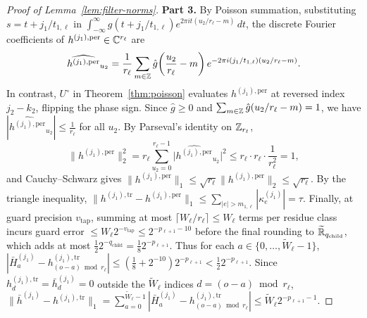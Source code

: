 \begin{proof}[Proof of Lemma~\ref{lem:filter-norms}]
\textbf{Part 3.} By Poisson summation, substituting $s = t + j_1/t_{1,\ell}$ in $\int_{-\infty}^\infty g(t + j_1/t_{1,\ell}) e^{2\pi i t(u_2/r_\ell - m)}\,dt$, the discrete Fourier coefficients of $h^{(j_1),\mathrm{per}} \in \mathbb{C}^{r_\ell}$ are
\[
  \widehat{h^{(j_1),\mathrm{per}}}_{u_2} = \frac{1}{r_\ell} \sum_{m \in \mathbb{Z}} \hat{g}\!\left(\frac{u_2}{r_\ell} - m\right) e^{-2\pi i (j_1/t_{1,\ell})(u_2/r_\ell - m)}.
\]
In contrast, $U^\circ$ in Theorem~\ref{thm:poisson} evaluates $h^{(j_1),\mathrm{per}}$ at reversed index $j_2 - k_2$, flipping the phase sign. Since $\hat{g} \ge 0$ and $\sum_{m \in \mathbb{Z}} \hat{g}(u_2/r_\ell - m) = 1$, we have $|\widehat{h^{(j_1),\mathrm{per}}}_{u_2}| \le \frac{1}{r_\ell}$ for all $u_2$. By Parseval's identity on $\mathbb{Z}_{r_\ell}$,
\[
  \|h^{(j_1),\mathrm{per}}\|_2^2 = r_\ell \sum_{u_2=0}^{r_\ell-1} \bigl|\widehat{h^{(j_1),\mathrm{per}}}_{u_2}\bigr|^2 \le r_\ell \cdot r_\ell \cdot \frac{1}{r_\ell^2} = 1,
\]
and Cauchy--Schwarz gives $\|h^{(j_1),\mathrm{per}}\|_1 \le \sqrt{r_\ell}\|h^{(j_1),\mathrm{per}}\|_2 \le \sqrt{r_\ell}$. By the triangle inequality, $\|h^{(j_1),\mathrm{tr}} - h^{(j_1),\mathrm{per}}\|_1 \le \sum_{|e| > m_{1,\ell}} |\kappa^{(j_1)}_e| = \tau$. Finally, at guard precision $v_{\mathrm{tap}}$, summing at most $\lceil W_\ell/r_\ell \rceil \le W_\ell$ terms per residue class incurs guard error $\le W_\ell 2^{-v_{\mathrm{tap}}} \le 2^{-p_{\ell+1}-10}$ before the final rounding to $\widetilde{\mathbb{R}}_{q_{\mathrm{child}}}$, which adds at most $\frac{1}{2} 2^{-q_{\mathrm{child}}} = \frac{1}{8} 2^{-p_{\ell+1}}$. Thus for each $a \in \{0, \dots, \tilde{W}_\ell-1\}$, $|\bar{H}^{(j_1)}_a - h^{(j_1),\mathrm{tr}}_{(o-a)\bmod r_\ell}| \le (\frac{1}{8} + 2^{-10})2^{-p_{\ell+1}} < \frac{1}{2} 2^{-p_{\ell+1}}$. Since $h^{(j_1),\mathrm{tr}}_d = \bar{h}^{(j_1)}_d = 0$ outside the $\tilde{W}_\ell$ indices $d = (o - a) \bmod r_\ell$, $\|\bar{h}^{(j_1)} - h^{(j_1),\mathrm{tr}}\|_1 = \sum_{a=0}^{\tilde{W}_\ell-1} |\bar{H}^{(j_1)}_a - h^{(j_1),\mathrm{tr}}_{(o-a)\bmod r_\ell}| \le \tilde{W}_\ell 2^{-p_{\ell+1}-1}$.
\end{proof}
